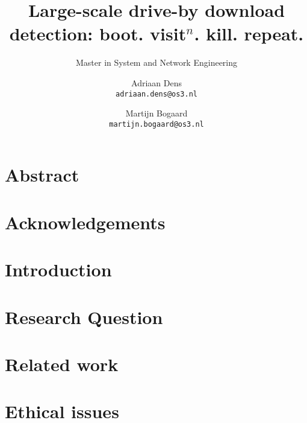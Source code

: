 \documentclass{scrartcl}
\title{Large-scale drive-by download detection: boot. visit$^n$. kill. repeat.}
\subtitle{Master in System and Network Engineering}
\author{
  Adriaan Dens\\
   \texttt{adriaan.dens@os3.nl}
  \and
  Martijn Bogaard\\
   \texttt{martijn.bogaard@os3.nl}
}
\begin{document}
\maketitle

\tableofcontents

\section{Abstract}

\section{Acknowledgements}

\section{Introduction}


\section{Research Question}


\section{Related work}


\section{Ethical issues}




\end{document}

